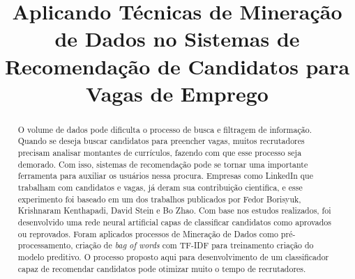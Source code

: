 \documentclass[conference]{IEEEtran}
\begin{document}
\title{Aplicando Técnicas de Mineração de Dados no Sistemas de Recomendação de Candidatos para Vagas de Emprego}

\author{
    \and
}
\maketitle

\begin{abstract}
O volume de dados pode dificulta o processo de busca e filtragem de informação.  Quando se deseja buscar candidatos para preencher vagas, muitos recrutadores precisam analisar montantes de currículos, fazendo com que esse processo seja demorado. Com isso, sistemas de recomendação pode se tornar uma importante ferramenta para auxiliar os usuários nessa procura. Empresas como LinkedIn que trabalham com candidatos e vagas, já deram sua contribuição cientifica, e esse experimento foi baseado em um dos trabalhos publicados por Fedor Borisyuk, Krishnaram Kenthapadi, David Stein e Bo Zhao. Com base nos estudos realizados, foi desenvolvido uma rede neural artificial capas de classificar candidatos como aprovados ou reprovados. Foram aplicados processos de Mineração de Dados como pré-processamento, criação de \textit{bag of words } com TF-IDF para treinamento criação do modelo preditivo. O processo proposto aqui para desenvolvimento de um classificador capaz de recomendar candidatos pode otimizar muito o tempo de recrutadores.
\end{abstract}
\end{document}
